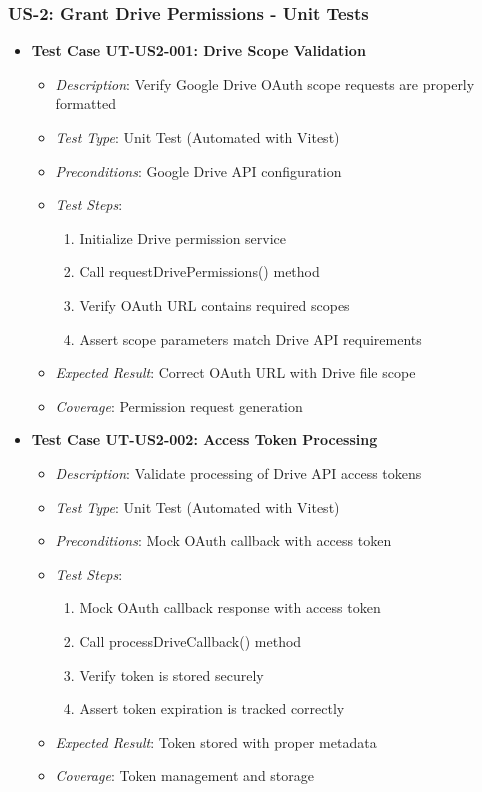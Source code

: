 \documentclass[12pt]{article}
\begin{document}
\subsubsection{US-2: Grant Drive Permissions - Unit Tests}
\begin{itemize}
  \item \textbf{Test Case UT-US2-001: Drive Scope Validation}
    \begin{itemize}
      \item \textit{Description}: Verify Google Drive OAuth scope requests are properly formatted
      \item \textit{Test Type}: Unit Test (Automated with Vitest)
      \item \textit{Preconditions}: Google Drive API configuration
      \item \textit{Test Steps}:
        \begin{enumerate}
          \item Initialize Drive permission service
          \item Call requestDrivePermissions() method
          \item Verify OAuth URL contains required scopes
          \item Assert scope parameters match Drive API requirements
        \end{enumerate}
      \item \textit{Expected Result}: Correct OAuth URL with Drive file scope
      \item \textit{Coverage}: Permission request generation
    \end{itemize}

  \item \textbf{Test Case UT-US2-002: Access Token Processing}
    \begin{itemize}
      \item \textit{Description}: Validate processing of Drive API access tokens
      \item \textit{Test Type}: Unit Test (Automated with Vitest)
      \item \textit{Preconditions}: Mock OAuth callback with access token
      \item \textit{Test Steps}:
        \begin{enumerate}
          \item Mock OAuth callback response with access token
          \item Call processDriveCallback() method
          \item Verify token is stored securely
          \item Assert token expiration is tracked correctly
        \end{enumerate}
      \item \textit{Expected Result}: Token stored with proper metadata
      \item \textit{Coverage}: Token management and storage
    \end{itemize}
\end{itemize}
\end{document}
